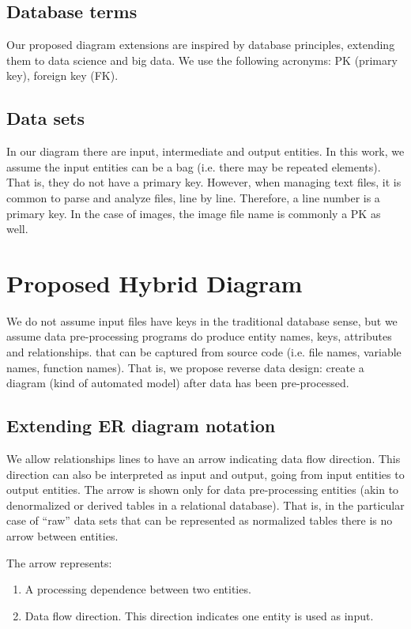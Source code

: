 \documentclass[sigconf,edbt]{acmart-edbt-workshops}
\newcommand{\+}{\discretionary{\mbox{${\bm\cdot}\mkern-1mu$}}{}{}}
\begin{document}
\subsection{Database terms}

Our proposed diagram extensions are inspired by database principles, extending them to
data science and big data.
We use the following acronyms: PK (primary key), foreign key (FK).


\subsection{Data sets}

In our diagram there are input, intermediate and output entities.
In this work, we assume the input entities can be a bag (i.e. there may be repeated elements).
That is, they do not have a primary key.
However, when managing text files, it is common to parse and analyze files, line by line.
Therefore, a line number is a primary key.
In the case of images, the image file name is commonly a PK as well.

\section{Proposed Hybrid Diagram }

We do not assume input files have keys in the traditional database sense,
but we assume data pre-processing programs do produce entity names, keys, attributes
and relationships.
that can be captured from source code (i.e. file names, variable names, function names).
That is, we propose reverse data design:
create a diagram (kind of automated model) after data has been pre-processed.

\subsection{Extending ER diagram notation} 

We allow relationships lines to have an arrow 
indicating data flow direction.
This direction can also be interpreted as input and output, going from input entities
to output entities.
The arrow is shown only for data pre-processing entities (akin to denormalized or derived tables
in a relational database).
That is, in the particular case of ``raw'' data sets that can be represented 
as normalized tables there is no arrow between entities.

The arrow represents:
\begin{enumerate}
\item A processing dependence between two entities.  
\item Data flow direction. This direction indicates one entity is used as 
input.
\end{enumerate}
\end{document}
